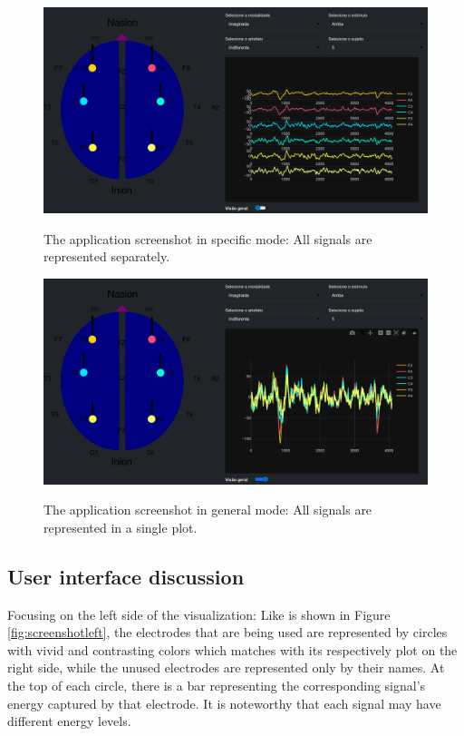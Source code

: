 \documentclass[format=sigconf]{acmart}
\begin{document}
		\begin{figure}[h]
			\centering
			\caption{The application screenshot in specific mode: All signals are represented separately.}
			\includegraphics[width=\linewidth]{images/screenshot01}
			\label{fig:screenshot01}
		\end{figure}
		
		\begin{figure}[h]
			\centering
			\caption{The application screenshot in general mode: All signals are represented in a single plot.}
			\includegraphics[width=\linewidth]{images/screenshot02}
			\label{fig:screenshot02}
		\end{figure}
	
		\subsection{User interface discussion}
			\par Focusing on the left side of the visualization: Like is shown in Figure \ref{fig:screenshotleft}, the electrodes that are being used are represented by circles with vivid and contrasting colors which matches with its respectively plot on the right side, while the unused electrodes are represented only by their names. At the top of each circle, there is a bar representing the corresponding signal's energy captured by that electrode. It is noteworthy that each signal may have different energy levels.
		
\end{document}
